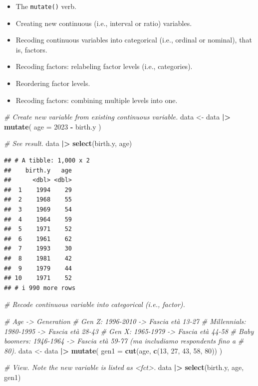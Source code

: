 \documentclass[
]{book}
\newenvironment{Shaded}{\begin{snugshade}}{\end{snugshade}}
\newcommand{\AttributeTok}[1]{\textcolor[rgb]{0.13,0.29,0.53}{#1}}
\newcommand{\CommentTok}[1]{\textcolor[rgb]{0.56,0.35,0.01}{\textit{#1}}}
\newcommand{\DecValTok}[1]{\textcolor[rgb]{0.00,0.00,0.81}{#1}}
\newcommand{\FunctionTok}[1]{\textcolor[rgb]{0.13,0.29,0.53}{\textbf{#1}}}
\newcommand{\NormalTok}[1]{#1}
\newcommand{\OtherTok}[1]{\textcolor[rgb]{0.56,0.35,0.01}{#1}}
\newcommand{\SpecialCharTok}[1]{\textcolor[rgb]{0.81,0.36,0.00}{\textbf{#1}}}
\providecommand{\tightlist}{%
  \setlength{\itemsep}{0pt}\setlength{\parskip}{0pt}}
\begin{document}
\begin{itemize}
\tightlist
\item
  The \texttt{mutate()} verb.
\item
  Creating new continuous (i.e., interval or ratio) variables.
\item
  Recoding continuous variables into categorical (i.e., ordinal or nominal), that is, factors.
\item
  Recoding factors: relabeling factor levels (i.e., categories).
\item
  Reordering factor levels.
\item
  Recoding factors: combining multiple levels into one.
\end{itemize}

\begin{Shaded}
\begin{Highlighting}[]
\CommentTok{\# Create new variable from existing continuous variable.}
\NormalTok{data }\OtherTok{\textless{}{-}}\NormalTok{ data }\SpecialCharTok{|\textgreater{}} 
  \FunctionTok{mutate}\NormalTok{(}
    \AttributeTok{age =} \DecValTok{2023} \SpecialCharTok{{-}}\NormalTok{ birth.y}
\NormalTok{  )}

\CommentTok{\# See result.}
\NormalTok{data }\SpecialCharTok{|\textgreater{}} 
  \FunctionTok{select}\NormalTok{(birth.y, age)}
\end{Highlighting}
\end{Shaded}

\begin{verbatim}
## # A tibble: 1,000 x 2
##    birth.y   age
##      <dbl> <dbl>
##  1    1994    29
##  2    1968    55
##  3    1969    54
##  4    1964    59
##  5    1971    52
##  6    1961    62
##  7    1993    30
##  8    1981    42
##  9    1979    44
## 10    1971    52
## # i 990 more rows
\end{verbatim}

\begin{Shaded}
\begin{Highlighting}[]
\CommentTok{\# Recode continuous variable into categorical (i.e., factor).}

\CommentTok{\# Age {-}\textgreater{} Generation}
\CommentTok{\# Gen Z: 1996{-}2010 {-}\textgreater{} Fascia età 13{-}27}
\CommentTok{\# Millennials: 1980{-}1995 {-}\textgreater{} Fascia età 28{-}43}
\CommentTok{\# Gen X: 1965{-}1979 {-}\textgreater{} Fascia età 44{-}58}
\CommentTok{\# Baby boomers: 1946{-}1964 {-}\textgreater{} Fascia età 59{-}77 (ma includiamo respondents fino a }
\CommentTok{\# 80).}
\NormalTok{data }\OtherTok{\textless{}{-}}\NormalTok{ data }\SpecialCharTok{|\textgreater{}} 
  \FunctionTok{mutate}\NormalTok{(}
    \AttributeTok{gen1 =} \FunctionTok{cut}\NormalTok{(age, }\FunctionTok{c}\NormalTok{(}\DecValTok{13}\NormalTok{, }\DecValTok{27}\NormalTok{, }\DecValTok{43}\NormalTok{, }\DecValTok{58}\NormalTok{, }\DecValTok{80}\NormalTok{))}
\NormalTok{  )}

\CommentTok{\# View. Note the new variable is listed as \textless{}fct\textgreater{}.}
\NormalTok{data }\SpecialCharTok{|\textgreater{}} 
  \FunctionTok{select}\NormalTok{(birth.y, age, gen1)}
\end{Highlighting}
\end{Shaded}
\end{document}
